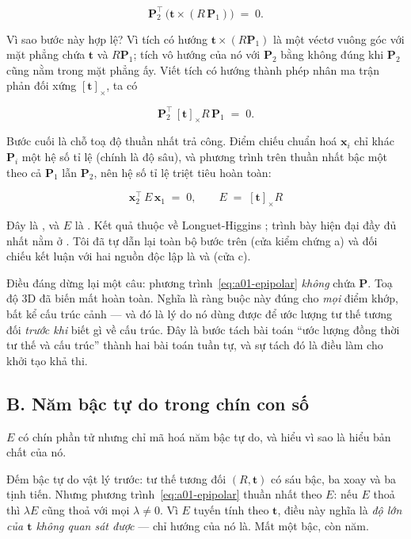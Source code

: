 \documentclass[../../vslam.tex]{subfiles}
\begin{document}
\[
\mathbf{P}_2^{\top}\,\bigl(\mathbf{t} \times (R\,\mathbf{P}_1)\bigr) \;=\; 0 .
\]

Vì sao bước này hợp lệ? Vì tích có hướng \(\mathbf{t} \times (R\mathbf{P}_1)\) là một véctơ vuông góc với mặt phẳng chứa \(\mathbf{t}\) và \(R\mathbf{P}_1\); tích vô hướng của nó với \(\mathbf{P}_2\) bằng không đúng khi \(\mathbf{P}_2\) cũng nằm trong mặt phẳng ấy. Viết tích có hướng thành phép nhân ma trận phản đối xứng \([\mathbf{t}]_\times\), ta có

\[
\mathbf{P}_2^{\top}\,[\mathbf{t}]_\times R\,\mathbf{P}_1 \;=\; 0 .
\]

Bước cuối là chỗ toạ độ thuần nhất trả công. Điểm chiếu chuẩn hoá \(\mathbf{x}_i\) chỉ khác \(\mathbf{P}_i\) một hệ số tỉ lệ (chính là độ sâu), và phương trình trên thuần nhất bậc một theo cả \(\mathbf{P}_1\) lẫn \(\mathbf{P}_2\), nên hệ số tỉ lệ triệt tiêu hoàn toàn:

\begin{equation}
\boxed{\;\mathbf{x}_2^{\top}\, E\, \mathbf{x}_1 \;=\; 0, \qquad E \;=\; [\mathbf{t}]_\times R \;}
\label{eq:a01-epipolar}
\end{equation}

Đây là , và \(E\) là . Kết quả thuộc về Longuet-Higgins \cite{longuethiggins1981}; trình bày hiện đại đầy đủ nhất nằm ở \cite[§9.6]{hartley2004}. Tôi đã tự dẫn lại toàn bộ bước trên (cửa kiểm chứng a) và đối chiếu kết luận với hai nguồn độc lập là \cite{hartley2004} và \cite{ma2004invitation} (cửa c).

Điều đáng dừng lại một câu: phương trình~\eqref{eq:a01-epipolar} \emph{không} chứa \(\mathbf{P}\). Toạ độ \(3\)D đã biến mất hoàn toàn. Nghĩa là ràng buộc này đúng cho \emph{mọi} điểm khớp, bất kể cấu trúc cảnh --- và đó là lý do nó dùng được để ước lượng tư thế tương đối \emph{trước khi} biết gì về cấu trúc. Đây là bước tách bài toán ``ước lượng đồng thời tư thế và cấu trúc'' thành hai bài toán tuần tự, và sự tách đó là điều làm cho khởi tạo khả thi.

\subsection{B. Năm bậc tự do trong chín con số}

\(E\) có chín phần tử nhưng chỉ mã hoá năm bậc tự do, và hiểu vì sao là hiểu bản chất của nó.

Đếm bậc tự do vật lý trước: tư thế tương đối \((R, \mathbf{t})\) có sáu bậc, ba xoay và ba tịnh tiến. Nhưng phương trình~\eqref{eq:a01-epipolar} thuần nhất theo \(E\): nếu \(E\) thoả thì \(\lambda E\) cũng thoả với mọi \(\lambda \neq 0\). Vì \(E\) tuyến tính theo \(\mathbf{t}\), điều này nghĩa là \emph{độ lớn của \(\mathbf{t}\) không quan sát được} --- chỉ hướng của nó là. Mất một bậc, còn năm.
\end{document}
